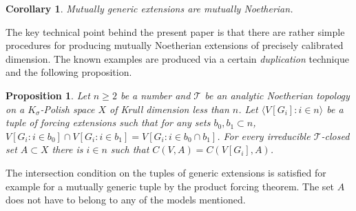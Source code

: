 \documentclass{article}
\newcommand{\gs}{\sigma}
\newtheorem{corollary}[theorem]{Corollary}
\newtheorem{proposition}[theorem]{Proposition}
\theoremstyle{definition}
\begin{document}
\begin{corollary}
Mutually generic extensions are mutually Noetherian.
\end{corollary}


\noindent The key technical point behind the present paper is that there are rather simple procedures for producing mutually Noetherian extensions of precisely calibrated dimension. The known examples are produced via a certain \emph{duplication} technique and the following proposition.


\begin{proposition}
\label{neatproposition}
Let $n\geq 2$ be a number and $\mathcal{T}$ be an analytic Noetherian topology on a $K_\gs$-Polish space $X$ of Krull dimension less than $n$. Let $\langle V[G_i]\colon i\in n\rangle$ be a tuple of forcing extensions such that for any sets $b_0, b_1\subset n$, $V[G_i\colon i\in b_0]\cap V[G_i\colon i\in b_1]=V[G_i\colon i\in b_0\cap b_1]$. For every irreducible $\mathcal{T}$-closed set $A\subset X$ there is $i\in n$ such that $C(V, A)=C(V[G_i], A)$.
\end{proposition}

\noindent The intersection condition on the tuples of generic extensions is satisfied for example for a mutually generic tuple by the product forcing theorem. The set $A$ does not have to belong to any of the models mentioned.
\end{document}
